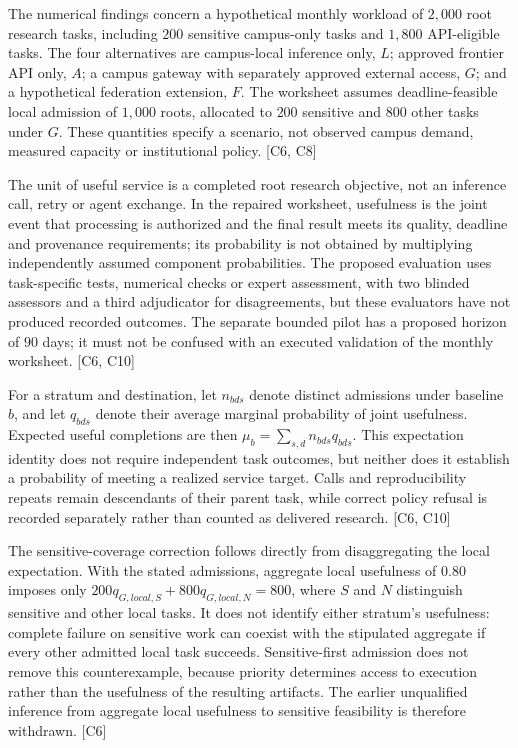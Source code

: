\documentclass[11pt]{article}
\begin{document}
The numerical findings concern a hypothetical monthly workload of $2{,}000$ root research tasks, including $200$ sensitive campus-only tasks and $1{,}800$ API-eligible tasks. The four alternatives are campus-local inference only, $L$; approved frontier API only, $A$; a campus gateway with separately approved external access, $G$; and a hypothetical federation extension, $F$. The worksheet assumes deadline-feasible local admission of $1{,}000$ roots, allocated to $200$ sensitive and $800$ other tasks under $G$. These quantities specify a scenario, not observed campus demand, measured capacity or institutional policy. [C6, C8]

The unit of useful service is a completed root research objective, not an inference call, retry or agent exchange. In the repaired worksheet, usefulness is the joint event that processing is authorized and the final result meets its quality, deadline and provenance requirements; its probability is not obtained by multiplying independently assumed component probabilities. The proposed evaluation uses task-specific tests, numerical checks or expert assessment, with two blinded assessors and a third adjudicator for disagreements, but these evaluators have not produced recorded outcomes. The separate bounded pilot has a proposed horizon of $90$ days; it must not be confused with an executed validation of the monthly worksheet. [C6, C10]

For a stratum and destination, let $n_{bds}$ denote distinct admissions under baseline $b$, and let $q_{bds}$ denote their average marginal probability of joint usefulness. Expected useful completions are then $\mu_b=\sum_{s,d}n_{bds}q_{bds}$. This expectation identity does not require independent task outcomes, but neither does it establish a probability of meeting a realized service target. Calls and reproducibility repeats remain descendants of their parent task, while correct policy refusal is recorded separately rather than counted as delivered research. [C6, C10]

The sensitive-coverage correction follows directly from disaggregating the local expectation. With the stated admissions, aggregate local usefulness of $0.80$ imposes only $200q_{G,local,S}+800q_{G,local,N}=800$, where $S$ and $N$ distinguish sensitive and other local tasks. It does not identify either stratum\textquoteright{}s usefulness: complete failure on sensitive work can coexist with the stipulated aggregate if every other admitted local task succeeds. Sensitive-first admission does not remove this counterexample, because priority determines access to execution rather than the usefulness of the resulting artifacts. The earlier unqualified inference from aggregate local usefulness to sensitive feasibility is therefore withdrawn. [C6]
\end{document}
